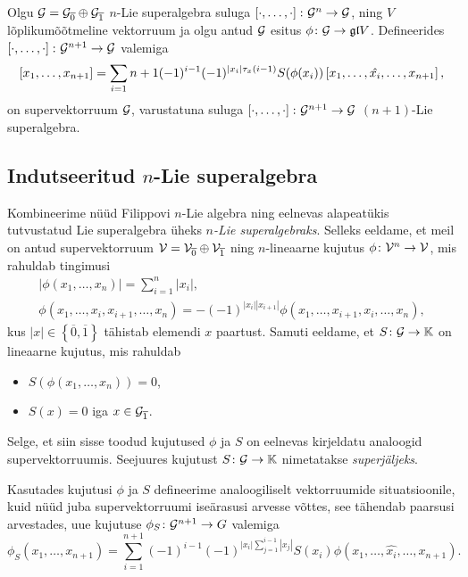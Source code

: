 \begin{thm}
    Olgu $\mathcal{G} = \mathcal{G}_{\overline{0}} \oplus \mathcal{G}_{\overline{1}}$
    $n$-Lie superalgebra suluga $\left[ \cdot, \dots, \cdot \right] \colon \mathcal{G}^n \to \mathcal{G}$,
    ning $V$ lõplikumõõtmeline vektorruum ja olgu
    antud $\mathcal{G}$ esitus $\phi \colon \mathcal{G} \to \mathfrak{gl} V$. Defineerides
    $\left[ \cdot, \dots, \cdot \right] \colon \mathcal{G}^{n+1} \to \mathcal{G}$ valemiga
    \[
        \left[ x_1, \dots, x_{n+1} \right] = \sum_{i=1}{n+1}
        (-1)^{i-1} (-1)^{|x_i| \tau_x (i-1)} S(\phi(x_i))
        \left[ x_1, \dots, \hat{x_i}, \dots, x_{n+1} \right],
    \]
    on supervektorruum $\mathcal{G}$, varustatuna suluga
    $\left[ \cdot, \dots, \cdot \right] \colon \mathcal{G}^{n+1} \to \mathcal{G}$ $(n+1)$-Lie
    superalgebra.
\end{thm}

\subsection{Indutseeritud \texorpdfstring{$n$}\ -Lie superalgebra}

Kombineerime nüüd Filippovi $n$-Lie algebra ning eelnevas alapeatükis
tutvustatud Lie superalgebra üheks \emph{$n$-Lie superalgebraks}. Selleks
eeldame, et meil on antud supervektorruum 
$\mathcal{V} = \mathcal{V}_{\overline{0}} \oplus \mathcal{V}_{\overline{1}}$
ning $n$-lineaarne kujutus $\phi \colon \mathcal{V}^n \to \mathcal{V}$, mis rahuldab
tingimusi
\begin{gather}
    |\phi(x_1, \dots, x_n)| = \sum_{i=1}^n |x_i|, \\
    \phi \left( x_1, \dots, x_i, x_{i+1}, \dots, x_n \right) =
        -(-1)^{ |x_i| |x_{i+1}| } \phi \left(
            x_1, \dots, x_{i+1}, x_i, \dots, x_n
        \right),
\end{gather}
kus $|x| \in \left\{ \overline{0}, \overline{1} \right\}$
tähistab elemendi $x$ paartust. Samuti eeldame, et $S \colon \mathcal{G} \to \mathbb{K}$
on lineaarne kujutus, mis rahuldab
\begin{itemize}
    \item $S \left( \phi \left( x_1, \dots, x_n \right) \right) = 0$,
    \item $S(x) = 0$ iga $x \in \mathcal{G}_{\overline{1}}$.
\end{itemize}

Selge, et siin sisse toodud kujutused $\phi$ ja $S$ on eelnevas
kirjeldatu analoogid supervektorruumis. Seejuures kujutust $S \colon \mathcal{G} \to \mathbb{K}$
nimetatakse \emph{superjäljeks}.

Kasutades kujutusi $\phi$ ja $S$ defineerime analoogiliselt
vektorruumide situatsioonile, kuid nüüd juba supervektorruumi iseärasusi
arvesse võttes, see tähendab paarsusi arvestades, uue kujutuse
$\phi_S \colon \mathcal{G}^{n+1} \to G$ valemiga
\[
    \phi_S (x_1, \dots, x_{n+1}) =
    \sum_{i=1}^{n+1} (-1)^{i-1}(-1)^{|x_i| \sum_{j=1}^{i-1} |x_j| }
        S(x_i) \phi \left(
            x_1, \dots, \hat{x_i}, \dots, x_{n+1}
        \right).
\]

